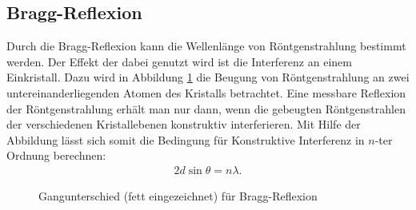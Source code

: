 \subsection{Bragg-Reflexion}
Durch die Bragg-Reflexion kann die Wellenlänge von Röntgenstrahlung bestimmt werden. Der Effekt der dabei genutzt wird ist die Interferenz an einem Einkristall. Dazu wird in Abbildung \ref{fig:bragg} die Beugung von Röntgenstrahlung an zwei untereinanderliegenden Atomen des Kristalls betrachtet. Eine messbare Reflexion der Röntgenstrahlung erhält man nur dann, wenn die gebeugten Röntgenstrahlen der verschiedenen Kristallebenen konstruktiv interferieren. Mit Hilfe der Abbildung lässt sich somit die Bedingung für Konstruktive Interferenz in $n$-ter Ordnung berechnen:
\begin{align}
  2d \sin \theta=n\lambda.
  \label{eq:bragg}
\end{align} 

\begin{figure}[h]
  \centering
  \caption{Gangunterschied (fett eingezeichnet) für Bragg-Reflexion}
  \label{fig:bragg}
\end{figure}
